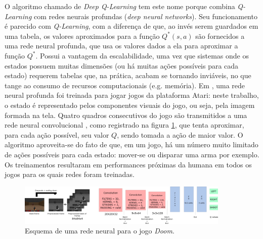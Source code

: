 \documentclass[cic,tc]{iiufrgs}
\begin{document}
O algoritmo chamado de \textit{Deep Q-Learning} tem este nome porque combina
\textit{Q-Learning} com redes neurais profundas (\textit{deep neural networks}).
Seu funcionamento é parecido com \textit{Q-Learning}, com a diferença de que, ao
invés serem guardados em uma tabela, os valores aproximados para a função
$Q^*(s, a)$ são fornecidos a uma rede neural profunda, que usa os valores
dados a ela para aproximar a função $Q^*$. Possui a vantagem da escalabilidade,
uma vez que sistemas onde os estados possuem muitas dimensões (ou há muitas
ações possíveis para cada estado) requerem tabelas que, na prática, acabam se
tornando inviáveis, no que tange ao consumo de recursos computacionais (e.g.
memória). Em \cite{atari2013}, uma rede neural profunda foi treinada para jogar jogos da
plataforma Atari: neste trabalho, o estado é representado pelos componentes
visuais do jogo, ou seja, pela imagem formada na tela. Quatro quadros
consecutivos do jogo são transmitidos a uma rede neural convolucional \cite{NIPS2012_4824},
como registrado na figura \ref{fig:doom_neural_network}, que
tenta aproximar, para cada ação possível, seu valor $Q$, sendo tomada a ação de
maior valor. O algoritmo aproveita-se do fato de que, em um jogo, há um número
muito limitado de ações possíveis para cada estado: mover-se ou disparar uma
arma por exemplo. Os treinamentos resultaram em performances próximas da humana
em todos os jogos para os quais redes foram treinadas.

\begin{figure}[h]
    \caption{Esquema de uma rede neural para o jogo \textit{Doom}.}
    \begin{center}
      \includegraphics[width=0.9\textwidth]{cnn_doom.png}
    \end{center}
    \label{fig:doom_neural_network}
\end{figure}
\end{document}
